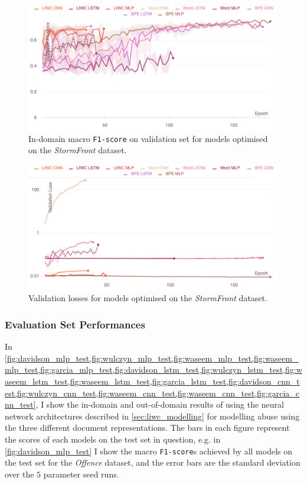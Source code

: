 \begin{figure}
    \centering
    \includegraphics[width=\textwidth]{garcia_dev_f1.pdf}
    \caption{In-domain macro \texttt{F1-score} on validation set for models optimised on the \textit{StormFront} dataset.}
    \label{fig:garcia_dev_f1}
\end{figure}
\begin{figure}
    \centering
    \includegraphics[width=\textwidth]{garcia_dev_loss_stderr_logscale.pdf}
    \caption{Validation losses for models optimised on the \textit{StormFront} dataset.}
    \label{fig:garcia_dev_loss}
\end{figure}

\subsubsection{Evaluation Set Performances}
In \cref{fig:davidson_mlp_test,fig:wulczyn_mlp_test,fig:waseem_mlp_test,fig:waseem_mlp_test,fig:garcia_mlp_test,fig:davidson_lstm_test,fig:wulczyn_lstm_test,fig:waseem_lstm_test,fig:waseem_lstm_test,fig:garcia_lstm_test,fig:davidson_cnn_test,fig:wulczyn_cnn_test,fig:waseem_cnn_test,fig:waseem_cnn_test,fig:garcia_cnn_test}, I show the in-domain and out-of-domain results of using the neural network architectures described in \cref{sec:liwc_modelling} for modelling abuse using the three different document representations.
The bars in each figure represent the scores of each models on the test set in question, e.g. in \cref{fig:davidson_mlp_test} I show the macro \texttt{F1-score}s achieved by all models on the test set for the \textit{Offence} dataset, and the error bars are the standard deviation over the $5$ parameter seed runs.

